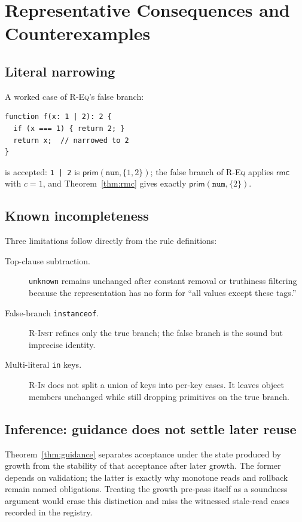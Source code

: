 \documentclass[11pt]{article}
\begin{document}
\section{Representative Consequences and Counterexamples}
\label{sec:examples}

\subsection{Literal narrowing}
A worked case of \textsc{R-Eq}'s false branch:
\begin{verbatim}
function f(x: 1 | 2): 2 {
  if (x === 1) { return 2; }
  return x;  // narrowed to 2
}
\end{verbatim}
is accepted: \texttt{1 | 2} is
$\mathsf{prim}(\texttt{num}, \{1,2\})$; the false branch of \textsc{R-Eq}
applies $\mathsf{rmc}$ with $c = 1$, and Theorem~\ref{thm:rmc} gives exactly
$\mathsf{prim}(\texttt{num}, \{2\})$.

\subsection{Known incompleteness}

Three limitations follow directly from the rule definitions:
\begin{description}
\item[Top-clause subtraction.] \texttt{unknown} remains unchanged after
  constant removal or truthiness filtering because the representation has no
  form for ``all values except these tags.''
\item[False-branch \texttt{instanceof}.] \textsc{R-Inst} refines only the
  true branch; the false branch is the sound but imprecise identity.
\item[Multi-literal \texttt{in} keys.] \textsc{R-In} does not split a union
  of keys into per-key cases. It leaves object members unchanged while still
  dropping primitives on the true branch.
\end{description}

\subsection{Inference: guidance does not settle later reuse}
Theorem~\ref{thm:guidance} separates acceptance under the state produced by
growth from the stability of that acceptance after later growth. The former
depends on validation; the latter is exactly why monotone reads and rollback
remain named obligations. Treating the growth pre-pass itself as a soundness
argument would erase this distinction and miss the witnessed stale-read cases
recorded in the registry.
\end{document}
